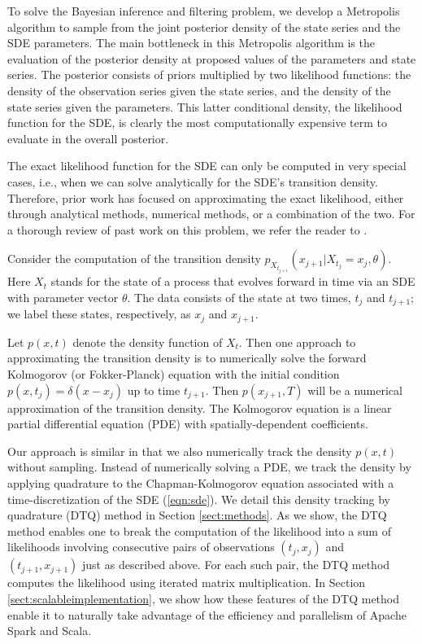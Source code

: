 \documentclass[wcp]{jmlr}
\begin{document}
To solve the Bayesian inference and filtering problem, we develop a
Metropolis algorithm to sample from the joint posterior density of the
state series and the SDE parameters.  The main bottleneck in this
Metropolis algorithm is the evaluation of the posterior density at
proposed values of the parameters and state series.  The posterior
consists of priors multiplied by two likelihood functions: the density
of the observation series given the state series, and the density of
the state series given the parameters.  This latter conditional
density, the likelihood function for the SDE, is clearly the most
computationally expensive term to evaluate in the overall posterior.

The exact likelihood function for the SDE can only be computed in very
special cases, i.e., when we can solve analytically for the SDE's
transition density.  Therefore, prior work has focused on
approximating the exact likelihood, either through analytical methods,
numerical methods, or a combination of the two.  For a thorough review
of past work on this problem, we refer the reader to \citet{sorensen2004parametric, iacus2009simulation, fuchs2013inference}.  

Consider the
computation of the transition density $p_{X_{t_{j+1}}}(x_{j+1} |
X_{t_j} = x_j, \theta)$.  Here $X_t$ stands for the state of a process that evolves
forward in time via an SDE with parameter vector $\theta$.  The data
consists of the state at two times, $t_j$ and $t_{j+1}$; we label
these states, respectively, as $x_j$ and $x_{j+1}$.

Let $p(x,t)$ denote the density function of $X_t$.  Then one approach
to approximating the transition density is to numerically solve the
forward Kolmogorov (or Fokker-Planck) equation with the initial
condition $p(x,t_j) = \delta(x-x_j)$ up to time $t_{j+1}$.  Then
$p(x_{j+1},T)$ will be a numerical approximation of the transition
density.  The Kolmogorov equation is a linear partial differential
equation (PDE) with spatially-dependent coefficients.

Our approach is similar in that we also numerically track the density
$p(x,t)$ without sampling.  Instead of numerically solving a PDE, we
track the density by applying quadrature to the Chapman-Kolmogorov
equation associated with a time-discretization of the SDE
(\ref{eqn:sde}). We detail this density tracking by quadrature (DTQ)
method in Section \ref{sect:methods}.  As we show, the DTQ method
enables one to break the computation of the likelihood into a sum of
likelihoods involving consecutive pairs of observations $(t_j,x_j)$
and $(t_{j+1},x_{j+1})$ just as described above.  For each such pair,
the DTQ method computes the likelihood using iterated matrix
multiplication.  In Section \ref{sect:scalableimplementation}, we show
how these features of the DTQ method enable it to
naturally take advantage of the efficiency and parallelism of Apache
Spark and Scala.
\end{document}
